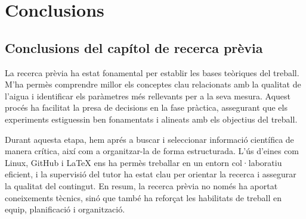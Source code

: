 \chapter{Conclusions}
\label{c:conclusions}

%
%
%

\section{Conclusions del capítol de recerca prèvia}

La recerca prèvia ha estat fonamental per establir les bases teòriques del treball. M'ha permès comprendre millor els conceptes clau relacionats amb la qualitat de l’aigua i identificar els paràmetres més rellevants per a la seva mesura. Aquest procés ha facilitat la presa de decisions en la fase pràctica, assegurant que els experiments estiguessin ben fonamentats i alineats amb els objectius del treball.

Durant aquesta etapa, hem aprés a buscar i seleccionar informació científica de manera crítica, així com a organitzar-la de forma estructurada. L’ús d’eines com Linux, GitHub i LaTeX ens ha permès treballar en un entorn col·laboratiu eficient, i la supervisió del tutor ha estat clau per orientar la recerca i assegurar la qualitat del contingut. En resum, la recerca prèvia no només ha aportat coneixements tècnics, sinó que també ha reforçat les habilitats de treball en equip, planificació i organització.

